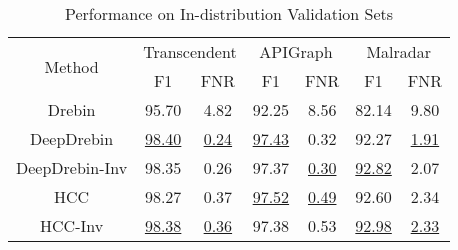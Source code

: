 \begin{table}[htb]
\caption{Performance on In-distribution Validation Sets}
\label{tab: IID}
\centering
\begin{tabular}{c|cc|cc|cc}
\toprule
\multirow{2}{*}{Method} & \multicolumn{2}{c|}{Transcendent}                  & \multicolumn{2}{c|}{APIGraph}                      & \multicolumn{2}{c}{Malradar}                      \\ \cline{2-7} 
& \multicolumn{1}{c|}{F1}       & \multicolumn{1}{c|}{FNR}        & \multicolumn{1}{c|}{F1}       & \multicolumn{1}{c|}{FNR}      
& \multicolumn{1}{c|}{F1}       & \multicolumn{1}{c}{FNR}      \\ \midrule
Drebin 
& \multicolumn{1}{c|}{95.70} & \multicolumn{1}{c|}{4.82} 
& \multicolumn{1}{c|}{92.25} & \multicolumn{1}{c|}{8.56} 
& \multicolumn{1}{c|}{82.14} & \multicolumn{1}{c}{9.80} \\
\midrule
DeepDrebin
& \multicolumn{1}{c|}{\underline{98.40}} & \multicolumn{1}{c|}{\underline{0.24}}
& \multicolumn{1}{c|}{\underline{97.43}} & \multicolumn{1}{c|}{0.32} 
& \multicolumn{1}{c|}{92.27} & \multicolumn{1}{c}{\underline{1.91}} \\
DeepDrebin-Inv
& \multicolumn{1}{c|}{98.35} & \multicolumn{1}{c|}{0.26} 
& \multicolumn{1}{c|}{97.37} & \multicolumn{1}{c|}{\underline{0.30}}
& \multicolumn{1}{c|}{\underline{92.82}} & \multicolumn{1}{c}{2.07} \\
\midrule
HCC
& \multicolumn{1}{c|}{98.27} & \multicolumn{1}{c|}{0.37} 
& \multicolumn{1}{c|}{\underline{97.52}} & \multicolumn{1}{c|}{\underline{0.49}}
& \multicolumn{1}{c|}{92.60} & \multicolumn{1}{c}{2.34} \\
HCC-Inv
& \multicolumn{1}{c|}{\underline{98.38}} & \multicolumn{1}{c|}{\underline{0.36}}
& \multicolumn{1}{c|}{97.38} & \multicolumn{1}{c|}{0.53} 
& \multicolumn{1}{c|}{\underline{92.98}} & \multicolumn{1}{c}{\underline{2.33}} \\
                      
\bottomrule
\end{tabular}  
\end{table}
